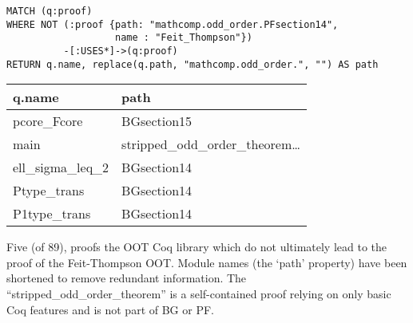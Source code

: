 \begin{verbatim}
MATCH (q:proof) 
WHERE NOT (:proof {path: "mathcomp.odd_order.PFsection14",
                   name : "Feit_Thompson"})
          -[:USES*]->(q:proof)
RETURN q.name, replace(q.path, "mathcomp.odd_order.", "") AS path
\end{verbatim}

\centering

\begin{tabular*}{\textwidth}{@{\extracolsep{\fill}} ll}

  \toprule

	\textbf{q.name}	& \textbf{path} \\

	\midrule

	pcore\_Fcore     & BGsection15 \\
	main            & stripped\_odd\_order\_theorem\ldots\\
	ell\_sigma\_leq\_2 & BGsection14 \\
	Ptype\_trans     & BGsection14 \\
	P1type\_trans    & BGsection14 \\

  \bottomrule

\end{tabular*}

\bigskip

\caption{Five (of 89), proofs the OOT Coq library which do not ultimately lead
  to the proof of the Feit-Thompson OOT. Module names (the `path' property)
  have been shortened to remove redundant information. The
  ``stripped\_odd\_order\_theorem'' is a self-contained proof relying on only
  basic Coq features and is not part of BG or PF.}\label{table:oot:leadto}
